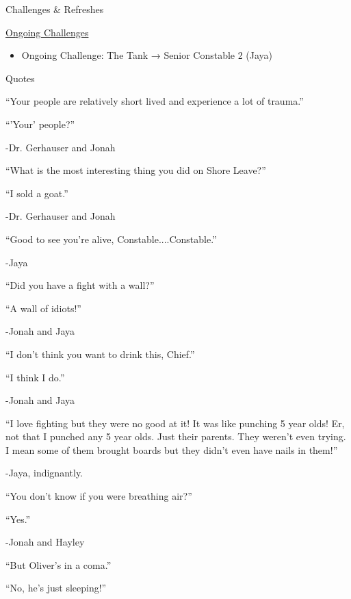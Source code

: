  {\LARGE Challenges \& Refreshes } 



\underline{  {\LARGE Ongoing Challenges }  }

\begin{itemize}
\item Ongoing Challenge: The Tank → Senior Constable 2 (Jaya)
\end{itemize}



 {\LARGE Quotes } 



``Your people are relatively short lived and experience a lot of trauma.''

``'Your' people?''

-Dr. Gerhauser and Jonah



``What is the most interesting thing you did on Shore Leave?''

``I sold a goat.''

        -Dr. Gerhauser and Jonah



``Good to see you're alive, Constable....Constable.''

        -Jaya



``Did you have a fight with a wall?''

``A wall of idiots!''

        -Jonah and Jaya



``I don't think you want to drink this, Chief.''

``I think I do.''

        -Jonah and Jaya



``I love fighting but they were no good at it!  It was like punching 5 year olds!  Er, not that I punched any 5 year olds.  Just their parents.  They weren't even trying. I mean some of them brought boards but they didn't even have nails in them!''

-Jaya, indignantly.



``You don't know if you were breathing air?''

``Yes.''

        -Jonah and Hayley



``But Oliver's in a coma.''

``No, he's just sleeping!''

